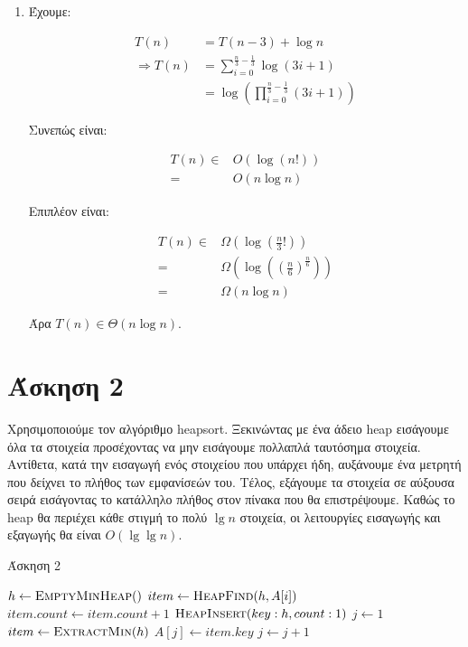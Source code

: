 \documentclass[11pt,a4paper]{book}
\begin{document}
\begin{enumerate}
\item Έχουμε:

\begin{align*}
            T( n ) &= T( n - 3 ) + \log n \\
\Rightarrow T( n ) &= \sum_{i = 0}^{\frac{n}{3} - \frac{1}{3}} \log( 3i + 1 )\\
                   &= \log( \prod_{i = 0}^{\frac{n}{3} - \frac{1}{3}} (3i + 1) )
\end{align*}

Συνεπώς είναι:

\begin{align*}
T( n ) \in & O( \log( n! ) )\\
         = & O( n \log n )
\end{align*}

Επιπλέον είναι:

\begin{align*}
T( n ) \in & \Omega( \log( \frac{n}{3}! ) ) \\
         = & \Omega( \log (( \frac{n}{6} )^{\frac{n}{6}}) ) \\
         = & \Omega( n \log n )
\end{align*}

Άρα $T( n ) \in \Theta( n \log n )$.
\end{enumerate}

\section*{Άσκηση 2}
Χρησιμοποιούμε τον αλγόριθμο \textlatin{heapsort}. Ξεκινώντας με ένα άδειο \textlatin{heap} εισάγουμε όλα τα στοιχεία προσέχοντας να μην εισάγουμε πολλαπλά ταυτόσημα στοιχεία. Αντίθετα, κατά την εισαγωγή ενός στοιχείου που υπάρχει ήδη, αυξάνουμε ένα μετρητή που δείχνει το πλήθος των εμφανίσεών του. Τέλος, εξάγουμε τα στοιχεία σε αύξουσα σειρά εισάγοντας το κατάλληλο πλήθος στον πίνακα που θα επιστρέψουμε. Καθώς το \textlatin{heap} θα περιέχει κάθε στιγμή το πολύ $\lg n$ στοιχεία, οι λειτουργίες εισαγωγής και εξαγωγής θα είναι $O( \lg \lg n )$.

\begin{algorithm}[H]
\caption{\textgreek{Άσκηση 2}}
\begin{algorithmic}[1]
    \State $h \gets \Call{EmptyMinHeap}$
        \State $item \gets \Call{HeapFind}{h, A[ i ]}$
            \State $item.count \gets item.count + 1$
        \Else
            \State $\Call{HeapInsert}{key: h, count: 1}$
        \EndIf
    \EndFor
    \State $j \gets 1$
        \State $item \gets \Call{ExtractMin}{h}$
            \State $A[ j ] \gets item.key$
            \State $j \gets j + 1$
        \EndFor
    \EndWhile
\EndProcedure
\end{algorithmic}
\end{algorithm}
\end{document}
